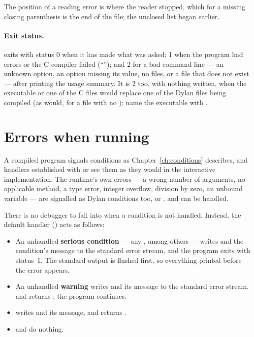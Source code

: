 The position of a reading error is where the reader stopped, which for a
missing closing parenthesis is the end of the file; the unclosed list
began earlier.

\paragraph{Exit status.} 
 exits with status 0 when it has made what was asked; 1 when
the program had errors or the C compiler failed (``''); and 2 for a bad command line --- an unknown option,
an option missing its value, no files, or a file that does not exist ---
after printing the usage summary. It is 2 too, with nothing written, when
the executable or one of the C files would replace one of the Dylan files
being compiled (as  would, for a file  with no
); name the executable with .

\section{Errors when running}\label{sec:dylanc-runtime-errors}

A compiled program signals conditions as Chapter~\ref{ch:conditions}
describes, and handlers established with  or
 see them as they would in the interactive
implementation. The runtime's own errors --- a wrong number of
arguments, no applicable method, a type error, integer overflow,
division by zero, an unbound variable --- are signalled as Dylan
conditions too,  or , and can be
handled.

There is no debugger to fall into when a condition is not handled.
Instead, the default handler () acts as follows:

\begin{itemize}
\item An unhandled \textbf{serious condition} --- any ,
  among others --- writes  and the condition's message
  to the standard error stream, and the program exits with status~1.
  The standard output is flushed first, so everything printed before the
  error appears.
\item An unhandled \textbf{warning} writes  and its
  message to the standard error stream, and  returns
  ; the program continues.
\item {} writes  and its message, and
  returns .
\item {} and  do nothing.
\end{itemize}

